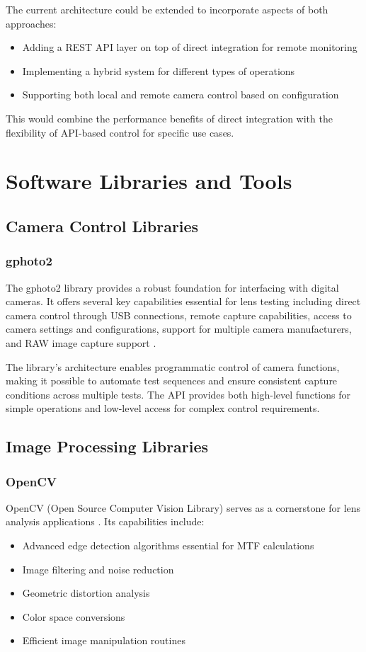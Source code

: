 The current architecture could be extended to incorporate aspects of both approaches:

\begin{itemize}
    \item Adding a REST API layer on top of direct integration for remote monitoring
    \item Implementing a hybrid system for different types of operations
    \item Supporting both local and remote camera control based on configuration
\end{itemize}

This would combine the performance benefits of direct integration with the flexibility of API-based control for specific use cases.


\section{Software Libraries and Tools}

\subsection{Camera Control Libraries}
\subsubsection{gphoto2}
The gphoto2 library provides a robust foundation for interfacing with digital cameras. It offers several key capabilities essential for lens testing including direct camera control through USB connections, remote capture capabilities, access to camera settings and configurations, support for multiple camera manufacturers, and RAW image capture support \cite{gphoto2}.

The library's architecture enables programmatic control of camera functions, making it possible to automate test sequences and ensure consistent capture conditions across multiple tests. The API provides both high-level functions for simple operations and low-level access for complex control requirements.

\subsection{Image Processing Libraries}
\subsubsection{OpenCV}
OpenCV (Open Source Computer Vision Library) serves as a cornerstone for lens analysis applications \cite{opencv}. Its capabilities include:
\begin{itemize}
    \item Advanced edge detection algorithms essential for MTF calculations
    \item Image filtering and noise reduction
    \item Geometric distortion analysis
    \item Color space conversions
    \item Efficient image manipulation routines
\end{itemize}

